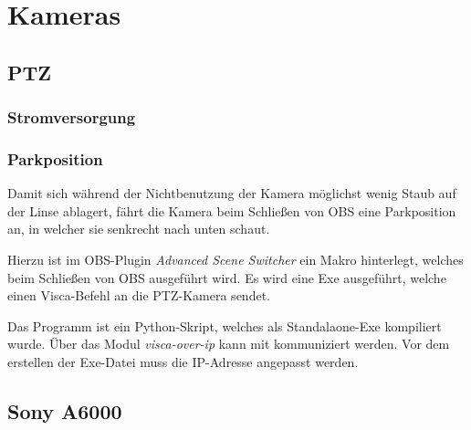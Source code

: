 \chapter{Kameras}
	\section{PTZ}
		\subsection{Stromversorgung}

		\subsection{Parkposition}
			Damit sich während der Nichtbenutzung der Kamera möglichst wenig Staub auf der Linse ablagert, fährt die Kamera beim Schließen von OBS eine Parkposition an, in welcher sie senkrecht nach unten schaut.

			Hierzu ist im \Gls{OBS}-Plugin \textit{Advanced Scene Switcher} ein Makro hinterlegt, welches beim Schließen von OBS ausgeführt wird.
			Es wird eine Exe ausgeführt, welche einen \Gls{Visca}-Befehl an die \Gls{PTZ-Kamera} sendet.

			Das Programm ist ein Python-Skript, welches als Standalaone-Exe kompiliert wurde.
			Über das Modul \textit{visca-over-ip} kann mit  kommuniziert werden.
			Vor dem erstellen der Exe-Datei muss die IP-Adresse angepasst werden.
	\section{Sony A6000}